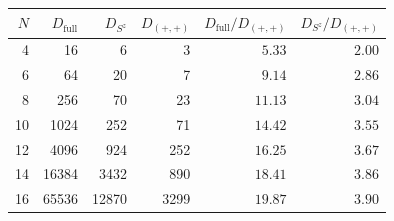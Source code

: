 \begin{tabular}{rrrrrr}
\toprule
$N$ & $D_{\text{full}}$ & $D_{S^z}$ & $D_{(+,+)}$ & $D_{\text{full}}/D_{(+,+)}$ & $D_{S^z}/D_{(+,+)}$ \\
\midrule
4 & 16 & 6 & 3 & $5.33$ & $2.00$ \\
6 & 64 & 20 & 7 & $9.14$ & $2.86$ \\
8 & 256 & 70 & 23 & $11.13$ & $3.04$ \\
10 & 1024 & 252 & 71 & $14.42$ & $3.55$ \\
12 & 4096 & 924 & 252 & $16.25$ & $3.67$ \\
14 & 16384 & 3432 & 890 & $18.41$ & $3.86$ \\
16 & 65536 & 12870 & 3299 & $19.87$ & $3.90$ \\
\bottomrule
\end{tabular}

